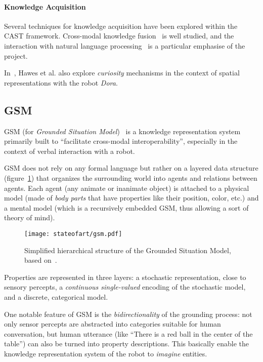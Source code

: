 \paragraph{Knowledge Acquisition} Several techniques for knowledge acquisition
have been explored within the CAST framework. Cross-modal knowledge
fusion~\cite{Hawes2007a} is well studied, and the interaction with natural
language processing~\cite{Kruijff2010, Kruijff2010a} is a particular emphasise
of the project.

In~\cite{Hawes2011}, Hawes et al. also explore \emph{curiosity} mechanisms in
the context of spatial representations with the robot \emph{Dora}.


\subsection{GSM}
\label{sect|gsm}

GSM (for \emph{Grounded Situation Model})~\cite{Mavridis2006} is a knowledge
representation system primarily built to ``facilitate cross-modal
interoperability'',  especially in the context of verbal interaction with a
robot.

GSM does not rely on any formal language but rather on a layered data structure
(figure~\ref{fig|gsm}) that organizes the surrounding world into agents and
relations between agents.  Each agent (any animate or inanimate object) is
attached to a physical model (made of \emph{body parts} that have properties
like their position, color, etc.) and a mental model (which is a recursively
embedded GSM, thus allowing a sort of theory of mind).

\begin{figure}
    \centering
    \texttt{[image: stateofart/gsm.pdf]}

    \caption{Simplified hierarchical structure of the Grounded Situation Model,
    based on~\cite{Mavridis2006}.}

    \label{fig|gsm}
\end{figure}

Properties are represented in three layers: a stochastic representation, close
to sensory percepts, a \emph{continuous single-valued} encoding of the
stochastic model, and a discrete, categorical model.

One notable feature of GSM is the \emph{bidirectionality} of the grounding
process: not only sensor percepts are abstracted into categories suitable for
human conversation, but human utterance (like ``There is a red ball in the
center of the table'') can also be turned into property descriptions. This
basically enable the knowledge representation system of the robot to
\emph{imagine} entities.


